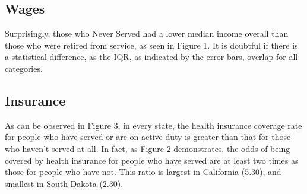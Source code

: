 \documentclass{article}
\begin{document}
\subsection{Wages}
Surprisingly, those who Never Served had a lower median income overall than those who were retired from service, as seen in Figure 1. It is doubtful if there is a statistical difference, as the IQR, as indicated by the error bars, overlap for all categories. 


\begin{figure}[ht!]
\begin{floatrow}
\end{floatrow}

\end{figure}




\subsection{Insurance}
As can be observed in Figure 3, in every state, the health insurance coverage rate for people who have served or are on active duty is greater than that for those who haven't served at all. In fact, as Figure 2 demonstrates, the odds of being covered by health insurance for people who have served are at least two times as those for people who have not. This ratio is largest in California (5.30), and smallest in South Dakota (2.30).
\end{document}
